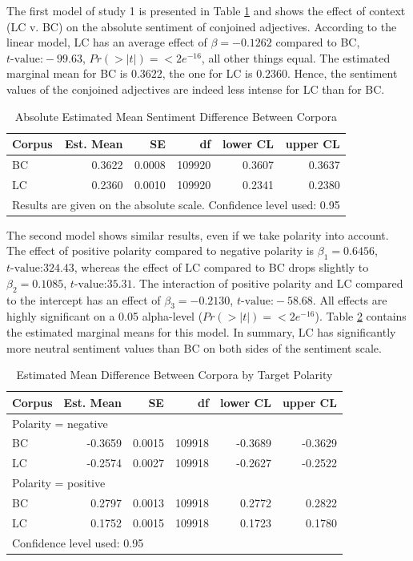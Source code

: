 \documentclass{article}
\begin{document}
The first model of study 1 is presented in Table \ref{tab:s1m1} and shows the effect of context (LC v. BC) on the absolute sentiment of conjoined adjectives. According to the linear model, LC has an average effect of $\beta = -0.1262$ compared to BC, $t\text{-value:} -99.63$, $Pr(>|t|) = <2e^{-16}$, all other things equal. The estimated marginal mean for BC is $0.3622$, the one for LC is $0.2360$. Hence, the sentiment values of the conjoined adjectives are indeed less intense for LC than for BC.

\begin{table}[ht]
\centering
\begin{tabular}{lrrrrr}
  \hline
Corpus & Est. Mean & SE & df & lower CL & upper CL \\ 
  \hline
BC & 0.3622 & 0.0008 & 109920 & 0.3607 & 0.3637 \\ 
  LC & 0.2360 & 0.0010 & 109920 & 0.2341 & 0.2380 \\ 
   \hline
\multicolumn{6}{l}{{\footnotesize Results are given on the absolute scale. Confidence level used: 0.95}}\\
\end{tabular}
\caption{Absolute Estimated Mean Sentiment Difference Between Corpora}
\label{tab:s1m1}
\end{table}

The second model shows similar results, even if we take polarity into account. The effect of positive polarity compared to negative polarity is $\beta_1 = 0.6456$, $t\text{-value:}324.43$, whereas the effect of LC compared to BC drops slightly to $\beta_2 = 0.1085$, $t\text{-value:}35.31$. The interaction of positive polarity and LC compared to the intercept has an effect of $\beta_3 = -0.2130$, $t\text{-value:}-58.68$. All effects are highly significant on a 0.05 alpha-level ($Pr(>|t|) = <2e^{-16}$). Table \ref{tab:s1m2} contains the estimated marginal means for this model. In summary, LC has significantly more neutral sentiment values than BC on both sides of the sentiment scale.

\begin{table}[ht]
\centering
\begin{tabular}{lrrrrr}
  \hline
Corpus & Est. Mean & SE & df & lower CL & upper CL \\ 
\hline
\multicolumn{6}{l}{Polarity = negative}\\
\cmidrule{1-2}
BC & -0.3659 & 0.0015 & 109918 & -0.3689 & -0.3629 \\ 
  LC & -0.2574 & 0.0027 & 109918 & -0.2627 & -0.2522 \\ 
   \cmidrule{1-6}
\multicolumn{6}{l}{Polarity = positive}\\
\cmidrule{1-2}
BC & 0.2797 & 0.0013 & 109918 & 0.2772 & 0.2822 \\ 
  LC & 0.1752 & 0.0015 & 109918 & 0.1723 & 0.1780 \\ 
   \hline
\multicolumn{6}{l}{{\footnotesize Confidence level used: 0.95}}\\
\end{tabular}
\caption{Estimated Mean Difference Between Corpora by Target Polarity}
\label{tab:s1m2}
\end{table}
\end{document}
